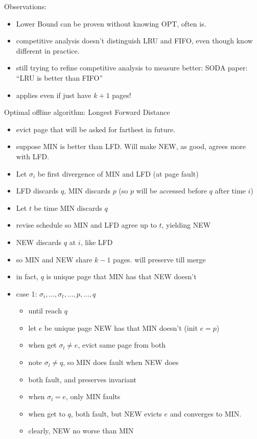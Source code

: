 \documentclass{article}
\begin{document}
Observations:
\begin{itemize}
\item Lower Bound can be proven without knowing OPT, often is.
\item competitive analysis doesn't distinguish LRU and FIFO, even
  though know different in practice.
\item still trying to refine competitive analysis to measure better:
  SODA paper: ``LRU is better than FIFO''
\item applies even if just have $k+1$ pages!
\end{itemize}

Optimal offline algorithm: Longest Forward Distance
\begin{itemize}
\item evict page that will be asked for farthest in future.
\item suppose MIN is better than LFD.  Will make NEW, as good,
  agrees more with LFD.
\item Let $\sigma_i$ be first divergence of MIN and LFD (at page
  fault)
\item LFD discards $q$, MIN discards $p$ (so $p$ will be accessed
  before $q$ after time $i$)
\item Let $t$ be time MIN discards $q$
\item revise schedule so MIN and LFD agree up to $t$, yielding NEW
\item NEW discards $q$ at $i$, like LFD
\item so MIN and NEW share $k-1$ pages.  will preserve till merge
\item in fact, $q$ is unique page that MIN has that NEW doesn't
\item case 1: $\sigma_i,\ldots,\sigma_t,\ldots,p,\ldots,q$
\begin{itemize}
\item until reach $q$
\item let $e$ be unique page NEW has that MIN doesn't (init $e=p$)
\item when get $\sigma_l\ne e$, evict same page from both
\item note  $\sigma_l \ne q$, so MIN does fault when NEW does
\item both fault, and preserves invariant
\item when $\sigma_l=e$, only MIN faults 
\item when get to $q$, both fault, but NEW evicts $e$ and converges to
  MIN.
\item clearly, NEW no worse than MIN
\end{itemize}

\end{itemize}
\end{document}
